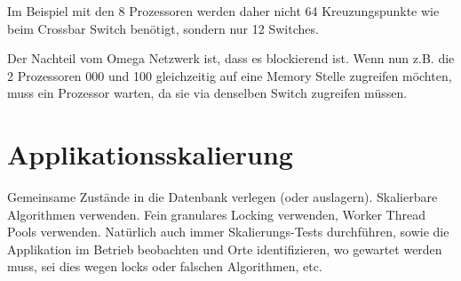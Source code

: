 Im Beispiel mit den 8 Prozessoren werden daher nicht 64 Kreuzungspunkte wie beim Crossbar Switch benötigt, sondern nur 12 Switches.

Der Nachteil vom Omega Netzwerk ist, dass es blockierend ist. Wenn nun z.B. die 2 Prozessoren 000 und 100 gleichzeitig auf eine Memory Stelle zugreifen möchten, muss ein Prozessor warten, da sie via denselben Switch zugreifen müssen.
\section{Applikationsskalierung}
Gemeinsame Zustände in die Datenbank verlegen (oder auslagern). Skalierbare Algorithmen verwenden. Fein granulares Locking verwenden, Worker Thread Pools verwenden. Natürlich auch immer Skalierungs-Tests durchführen, sowie die Applikation im Betrieb beobachten und Orte identifizieren, wo gewartet werden muss, sei dies wegen locks oder falschen Algorithmen, etc.
